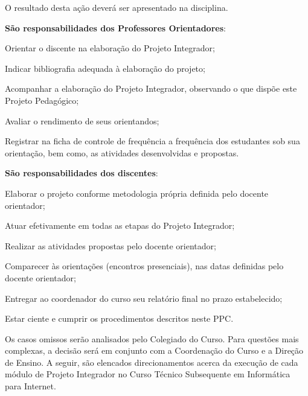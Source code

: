 \documentclass[
	12pt,				%
	openright,			%
	twoside,			%
	a4paper,			%
	chapter=TITLE,		%
	english,			%
	french,				%
	spanish,			%
	brazil,				%
	]{abntex2}
\begin{document}
O resultado desta ação deverá ser apresentado na disciplina.



\textbf{São responsabilidades dos Professores Orientadores}:
\begin{alineas}
    \item Orientar o discente na elaboração do Projeto Integrador;
    \item Indicar bibliografia adequada à elaboração do projeto;
    \item Acompanhar a elaboração do Projeto Integrador, observando o que dispõe este Projeto Pedagógico;
    \item Avaliar o rendimento de seus orientandos;
    \item Registrar na ficha de controle de frequência a frequência dos estudantes sob sua orientação, bem como, as atividades desenvolvidas e propostas.
\end{alineas}   

\textbf{São responsabilidades dos discentes}:
\begin{alineas}
    \item Elaborar o projeto conforme metodologia própria definida pelo docente orientador;
    \item Atuar efetivamente em todas as etapas do Projeto Integrador;
    \item Realizar as atividades propostas pelo docente orientador;
    \item Comparecer às orientações (encontros presenciais), nas datas definidas pelo docente orientador;
    \item  Entregar ao coordenador do curso seu relatório final no prazo estabelecido;
    \item  Estar ciente e cumprir os procedimentos descritos neste PPC.
\end{alineas}



Os casos omissos serão analisados pelo Colegiado do Curso. Para questões mais complexas, a decisão será em conjunto com a Coordenação do Curso e a Direção de Ensino. A seguir, são elencados direcionamentos acerca da execução de cada módulo de Projeto Integrador no Curso Técnico Subsequente em Informática para Internet.
\end{document}
